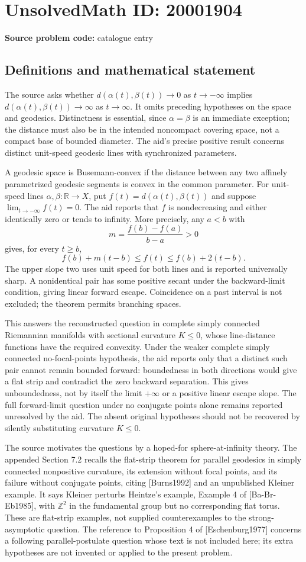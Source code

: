 \documentclass[11pt]{article}
\newcommand{\Z}{\mathbb{Z}}
\newcommand{\R}{\mathbb{R}}
\begin{document}
\section*{UnsolvedMath ID: 20001904}
\textbf{Source problem code:} catalogue entry
\subsection{Definitions and mathematical statement}
The source asks whether \(d(\alpha(t),\beta(t))\to0\) as \(t\to-\infty\) implies \(d(\alpha(t),\beta(t))\to\infty\) as \(t\to\infty\). It omits preceding hypotheses on the space and geodesics. Distinctness is essential, since \(\alpha=\beta\) is an immediate exception; the distance must also be in the intended noncompact covering space, not a compact base of bounded diameter. The aid's precise positive result concerns distinct unit-speed geodesic lines with synchronized parameters.

A geodesic space is Busemann-convex if the distance between any two affinely parametrized geodesic segments is convex in the common parameter. For unit-speed lines \(\alpha,\beta:\R\to X\), put \(f(t)=d(\alpha(t),\beta(t))\) and suppose \(\lim_{t\to-\infty}f(t)=0\). The aid reports that \(f\) is nondecreasing and either identically zero or tends to infinity. More precisely, any \(a<b\) with
\[
 m=\frac{f(b)-f(a)}{b-a}>0
\]
gives, for every \(t\ge b\),
\[
 f(b)+m(t-b)\le f(t)\le f(b)+2(t-b).
\]
The upper slope two uses unit speed for both lines and is reported universally sharp. A nonidentical pair has some positive secant under the backward-limit condition, giving linear forward escape. Coincidence on a past interval is not excluded; the theorem permits branching spaces.

This answers the reconstructed question in complete simply connected Riemannian manifolds with sectional curvature \(K\le0\), whose line-distance functions have the required convexity. Under the weaker complete simply connected no-focal-points hypothesis, the aid reports only that a distinct such pair cannot remain bounded forward: boundedness in both directions would give a flat strip and contradict the zero backward separation. This gives unboundedness, not by itself the limit \(+\infty\) or a positive linear escape slope. The full forward-limit question under no conjugate points alone remains reported unresolved by the aid. The absent original hypotheses should not be recovered by silently substituting curvature \(K\le0\).

The source motivates the questions by a hoped-for sphere-at-infinity theory. The appended Section 7.2 recalls the flat-strip theorem for parallel geodesics in simply connected nonpositive curvature, its extension without focal points, and its failure without conjugate points, citing [Burns1992] and an unpublished Kleiner example. It says Kleiner perturbs Heintze's example, Example 4 of [Ba-Br-Eb1985], with \(\Z^2\) in the fundamental group but no corresponding flat torus. These are flat-strip examples, not supplied counterexamples to the strong-asymptotic question. The reference to Proposition 4 of [Eschenburg1977] concerns a following parallel-postulate question whose text is not included here; its extra hypotheses are not invented or applied to the present problem.
\end{document}
